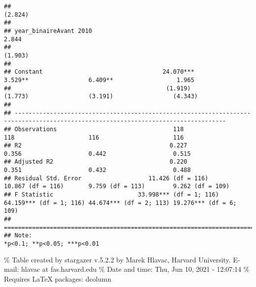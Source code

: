 \documentclass[
]{article}
\begin{document}
\begin{verbatim}
##                                                                                                                    (2.824)        
##                                                                                                                                   
## year_binaireAvant 2010                                                                                              2.844         
##                                                                                                                    (1.903)        
##                                                                                                                                   
## Constant                                  24.070***                3.529**                 6.409**                  1.965         
##                                            (1.919)                 (1.773)                 (3.191)                 (4.343)        
##                                                                                                                                   
## ----------------------------------------------------------------------------------------------------------------------------------
## Observations                                 118                     118                     116                     116          
## R2                                          0.227                   0.356                   0.442                   0.515         
## Adjusted R2                                 0.220                   0.351                   0.432                   0.488         
## Residual Std. Error                   11.426 (df = 116)       10.867 (df = 116)       9.759 (df = 113)        9.262 (df = 109)    
## F Statistic                        33.998*** (df = 1; 116) 64.159*** (df = 1; 116) 44.674*** (df = 2; 113) 19.276*** (df = 6; 109)
## ==================================================================================================================================
## Note:                                                                                                  *p<0.1; **p<0.05; ***p<0.01
\end{verbatim}

\% Table created by stargazer v.5.2.2 by Marek Hlavac, Harvard
University. E-mail: hlavac at fas.harvard.edu \% Date and time: Thu, Jun
10, 2021 - 12:07:14 \% Requires LaTeX packages: dcolumn
\end{document}
